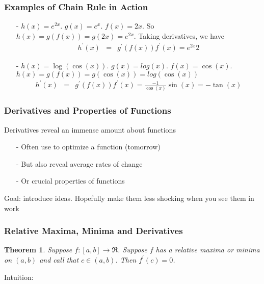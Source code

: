 \documentclass{beamer}
\newtheorem{thm}{Theorem}
\numberwithin{equation}{section}
\begin{document}
\begin{frame}
\frametitle{Examples of Chain Rule in Action}
\begin{itemize}
\item[-] $h(x) = e^{2x}$.  $g(x) = e^{x}$.  $f(x) = 2x$.  So $h(x) = g(f(x)) = g(2x) = e^{2x}$.  Taking derivatives, we have
\begin{eqnarray}
h^{'}(x) & = & g^{'}(f(x))f^{'}(x) = e^{2x}2 \nonumber 
\end{eqnarray}
\item[-] $h(x) = \log(\cos(x) )$.  $g(x) = log(x)$.  $f(x) = \cos(x)$.  $h(x) = g(f(x)) = g( \cos(x)) = log(\cos(x))$ 
\begin{eqnarray}
h^{'}(x) & = & g^{'}(f(x))f^{'}(x) = \frac{-1}{\cos(x)} \sin(x) = -\tan (x) \nonumber 
\end{eqnarray}
\end{itemize}

\end{frame}


\begin{frame}
\frametitle{Derivatives and Properties of Functions}

Derivatives reveal an \alert{immense} amount about functions
\begin{itemize}
\item[-] Often use to \alert{optimize} a function (tomorrow)
\item[-] But also reveal \alert{average rates of change}
\item[-] Or crucial properties of functions
\end{itemize}

Goal: introduce ideas.  Hopefully make them less shocking when you see them in work

\end{frame}

\begin{frame}
\frametitle{Relative Maxima, Minima and Derivatives}
\begin{thm} Suppose $f:[a, b] \rightarrow \Re$.  Suppose $f$ has a relative maxima or minima on $(a,b)$ and call that $c \in (a, b)$.  Then $f^{'}(c) = 0$.  \end{thm}

Intuition:




\end{frame}
\end{document}
